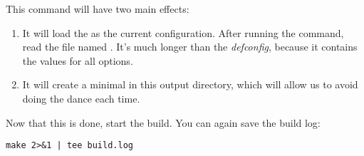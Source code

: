 This command will have two main effects:

\begin{enumerate}

\item It will load the  as the current
  configuration. After running the command, read the file named
  . It's much longer than the {\em defconfig}, because
  it contains the values for all options.

\item It will create a minimal  in this output
  directory, which will allow us to avoid doing the  dance each time.

\end{enumerate}

Now that this is done, start the build. You can again save the build
log:

\begin{verbatim}
make 2>&1 | tee build.log
\end{verbatim}
